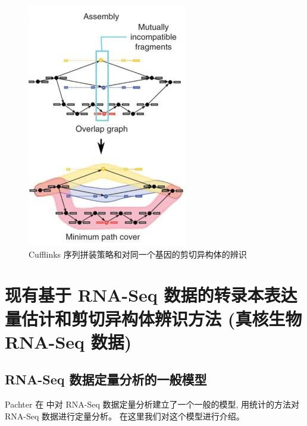 \begin{figure}[!t]
\centering
\includegraphics[height=0.5\textheight]{figures/cufflinks-assembly.jpg}
\caption{Cufflinks 序列拼装策略和对同一个基因的剪切异构体的辨识 \cite{cufflinks.2010}}
\label{intro-cufflinks-assembly}
\end{figure}


\section{现有基于 RNA-Seq 数据的转录本表达量估计和剪切异构体辨识方法 (真核生物 RNA-Seq 数据)}
\label{intro-rna-seq-tools-summary}

\subsection{RNA-Seq 数据定量分析的一般模型}
\label{rna-seq-general-model}

Pachter 在  中对 RNA-Seq 
数据定量分析建立了一个一般的模型, 
用统计的方法对 RNA-Seq 数据进行定量分析。 在这里我们对这个模型进行介绍。 

